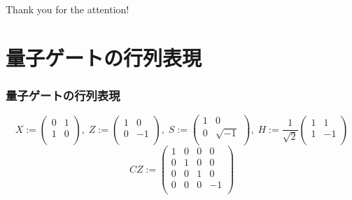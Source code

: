 \begin{frame}
  \centering
  {\Huge Thank you for the attention!}
\end{frame}

\appendix

\begin{frame}
  \frametitle{\appendixname}

  \tableofcontents
\end{frame}

\section{量子ゲートの行列表現}
\begin{frame}
  \frametitle{量子ゲートの行列表現}

  \centering
  \[
    X := \left(\begin{array}{cc}
      0 & 1 \\
      1 & 0 \\
    \end{array}\right),\;
    Z := \left(\begin{array}{cc}
      1 & 0 \\
      0 & -1 \\
    \end{array}\right),\;
    S := \left(\begin{array}{cc}
      1 & 0 \\
      0 & \sqrt{-1} \\
    \end{array}\right),\;
    H := \frac{1}{\sqrt{2}}\left(\begin{array}{cc}
      1 & 1 \\
      1 & -1 \\
    \end{array}\right)
  \]
  \[
    CZ := \left(\begin{array}{cccc}
      1 & 0 & 0 & 0 \\
      0 & 1 & 0 & 0  \\
      0 & 0 & 1 & 0  \\
      0 & 0 & 0 & -1  \\
    \end{array}\right)
  \]
\end{frame}


